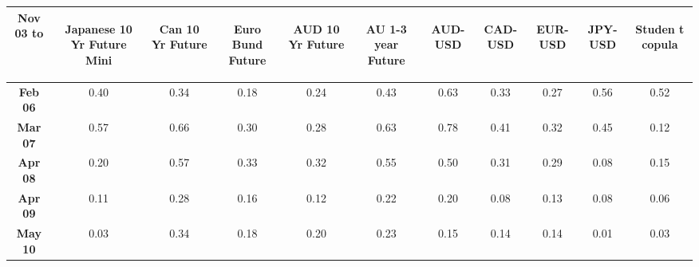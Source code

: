 \begin{onehalfspace}
\begin{scriptsize}\begin{tabular}{c| c c c c c c c c c|c}
\textbf{Nov 03 to}&\begin{sideways}\textbf{Japanese 10 Yr Future Mini}\end{sideways}&\begin{sideways}\textbf{Can 10 Yr Future}\end{sideways}&\begin{sideways}\textbf{Euro Bund Future}\end{sideways}&\begin{sideways}\textbf{AUD 10 Yr Future}\end{sideways}&\begin{sideways}\textbf{AU 1-3 year Future}\end{sideways}&\begin{sideways}\textbf{AUD-USD}\end{sideways}&\begin{sideways}\textbf{CAD-USD}\end{sideways}&\begin{sideways}\textbf{EUR-USD}\end{sideways}&\begin{sideways}\textbf{JPY-USD}\end{sideways}&\begin{sideways}\textbf{Studen t copula}\end{sideways}\\\hline
\textbf{Feb 06}&0.40&0.34&0.18&0.24&0.43&0.63&0.33&0.27&0.56&0.52\\
\textbf{Mar 07}&0.57&0.66&0.30&0.28&0.63&0.78&0.41&0.32&0.45&0.12\\
\textbf{Apr 08}&0.20&0.57&0.33&0.32&0.55&0.50&0.31&0.29&0.08&0.15\\
\textbf{Apr 09}&0.11&0.28&0.16&0.12&0.22&0.20&0.08&0.13&0.08&0.06\\
\textbf{May 10}&0.03&0.34&0.18&0.20&0.23&0.15&0.14&0.14&0.01&0.03\\
\end{tabular}
\end{scriptsize}
\end{onehalfspace}